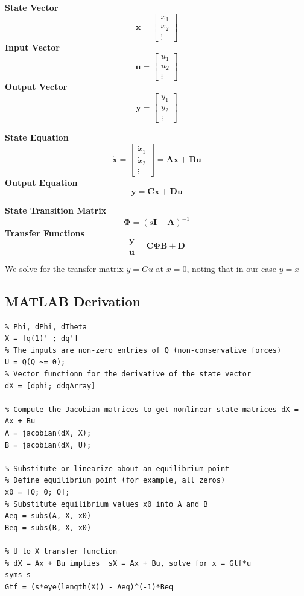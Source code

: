 \documentclass[11pt]{article}
\begin{document}
\textbf{State Vector}
\[
{\mathbf{x}} = 
\begin{bmatrix}
    x_1 \\
    x_2 \\
    \vdots
\end{bmatrix}
\]
\quad
\textbf{Input Vector}
\[
{\mathbf{u}} = 
\begin{bmatrix}
    u_1 \\
    u_2 \\
    \vdots
\end{bmatrix}
\]
\quad
\textbf{Output Vector}
\[
{\mathbf{y}} = 
\begin{bmatrix}
    y_1 \\
    y_2 \\
    \vdots
\end{bmatrix}
\]

\textbf{State Equation}
\[
\dot{\mathbf{x}} = 
\begin{bmatrix}
    \dot{x}_1 \\
    \dot{x}_2 \\
    \vdots
\end{bmatrix}
= \mathbf{A}{\mathbf{x}} + \mathbf{B}{\mathbf{u}}
\]
\quad
\textbf{Output Equation}
\[
{\mathbf{y}} = \mathbf{C}{\mathbf{x}} + \mathbf{D}{\mathbf{u}}
\]

\textbf{State Transition Matrix}
\[
\mathbf{\Phi} = (s\mathbf{I} - \mathbf{A})^{-1}
\]
\quad
\textbf{Transfer Functions}
\[
\frac{{\mathbf{y}}}{{\mathbf{u}}} = \mathbf{C}\mathbf{\Phi}\mathbf{B} + \mathbf{D}
\]

We solve for the transfer matrix $y = Gu$ at $x=0$, noting that in our case $y=x$ 

\subsection{MATLAB Derivation}

\begin{lstlisting}[caption={MATLAB Code}, label={lst:matlab_code}]
% State vector of the system, note that Theta is not a state variable
% Phi, dPhi, dTheta
X = [q(1)' ; dq']
% The inputs are non-zero entries of Q (non-conservative forces)
U = Q(Q ~= 0);
% Vector functionn for the derivative of the state vector
dX = [dphi; ddqArray]

% Compute the Jacobian matrices to get nonlinear state matrices dX = Ax + Bu
A = jacobian(dX, X);
B = jacobian(dX, U);

% Substitute or linearize about an equilibrium point
% Define equilibrium point (for example, all zeros)
x0 = [0; 0; 0];
% Substitute equilibrium values x0 into A and B
Aeq = subs(A, X, x0)
Beq = subs(B, X, x0)

% U to X transfer function
% dX = Ax + Bu implies  sX = Ax + Bu, solve for x = Gtf*u
syms s
Gtf = (s*eye(length(X)) - Aeq)^(-1)*Beq
\end{lstlisting}
\end{document}
